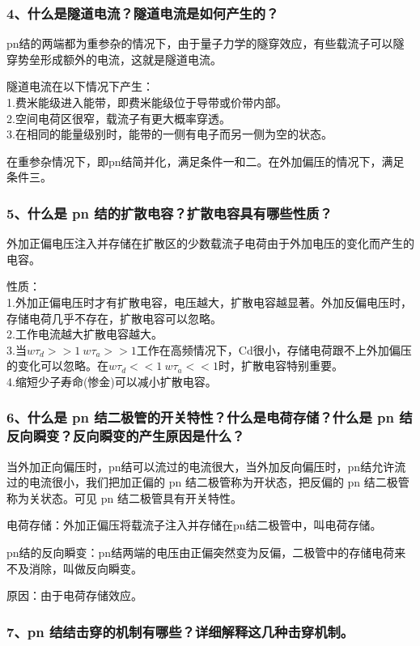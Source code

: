 \documentclass[cn,11pt]{elegantbook}
\begin{document}
\subsubsection*{4、什么是隧道电流？隧道电流是如何产生的？}
pn结的两端都为重参杂的情况下，由于量子力学的隧穿效应，有些载流子可以隧穿势垒形成额外的电流，这就是隧道电流。

隧道电流在以下情况下产生：\\
1.费米能级进入能带，即费米能级位于导带或价带内部。\\
2.空间电荷区很窄，载流子有更大概率穿透。\\
3.在相同的能量级别时，能带的一侧有电子而另一侧为空的状态。

在重参杂情况下，即pn结简并化，满足条件一和二。在外加偏压的情况下，满足条件三。
\subsubsection*{5、什么是 pn 结的扩散电容？扩散电容具有哪些性质？}
外加正偏电压注入并存储在扩散区的少数载流子电荷由于外加电压的变化而产生的电容。

性质：\\
1.外加正偏电压时才有扩散电容，电压越大，扩散电容越显著。外加反偏电压时，存储电荷几乎不存在，扩散电容可以忽略。\\
2.工作电流越大扩散电容越大。\\
3.当$w\tau_{d}>>1\ w\tau_{a}>>1$工作在高频情况下，Cd很小，存储电荷跟不上外加偏压的变化可以忽略。在$w\tau_{d}<<1\ w\tau_{a}<<1$时，扩散电容特别重要。\\
4.缩短少子寿命(惨金)可以减小扩散电容。
\subsubsection*{6、什么是 pn 结二极管的开关特性？什么是电荷存储？什么是 pn 结反向瞬变？反向瞬变的产生原因是什么？}
当外加正向偏压时，pn结可以流过的电流很大，当外加反向偏压时，pn结允许流过的电流很小，我们把加正偏的 pn 结二极管称为开状态，把反偏的 pn 结二极管称为关状态。可见 pn 结二极管具有开关特性。

电荷存储：外加正偏压将载流子注入并存储在pn结二极管中，叫电荷存储。

pn结的反向瞬变：pn结两端的电压由正偏突然变为反偏，二极管中的存储电荷来不及消除，叫做反向瞬变。

原因：由于电荷存储效应。
\subsubsection*{7、pn 结结击穿的机制有哪些？详细解释这几种击穿机制。}
\end{document}
